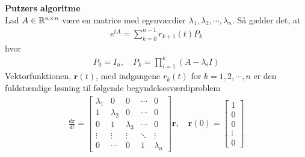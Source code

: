 \begin{thmx}\textbf{Putzers algoritme}\label{sæt:putzers_algoritme}\\
Lad $A \in \mathbb{R}^{n \times n}$ være en matrice med egenværdier $\lambda_1, \lambda_2, \cdots, \lambda_n$. Så gælder det, at
%
\begin{align}\label{eq:Putzer_algoritme}
    e^{tA} = \sum_{k=0}^{n-1}r_{k+1}(t)P_k
\end{align}
%
hvor
\begin{align}\label{eq:putzers_algoritme_P}
    P_0 = I_n, \quad P_k = \prod_{i=1}^k (A-\lambda_i I)
\end{align}
Vektorfunktionen, $\textbf{r}(t)$,  med indgangene $r_k(t)$ for $k=1, 2, \cdots, n$ er den fuldstændige løsning til følgende begyndelsesværdiproblem
%
\begin{align} \label{eq:putzers_algoritme_r(t)_begyndelsesværdiproblem}
    \frac{d\textbf{r}}{dt} = 
    \begin{bmatrix} 
        \lambda_1   &   0   & 0 & \cdots & 0\\
        1   & \lambda_2 & 0 & \cdots & 0\\
        0 & 1 & \lambda_3 & \cdots & 0\\
        \vdots & \vdots & \vdots & \ddots & \vdots\\
        0 & \cdots & 0 & 1 & \lambda_n
    \end{bmatrix}  \textbf{r} , \quad  \textbf{r}(0) = \begin{bmatrix} 1 \\ 0\\ 0\\ \vdots\\ 0 \end{bmatrix}
\end{align} 
\end{thmx}

